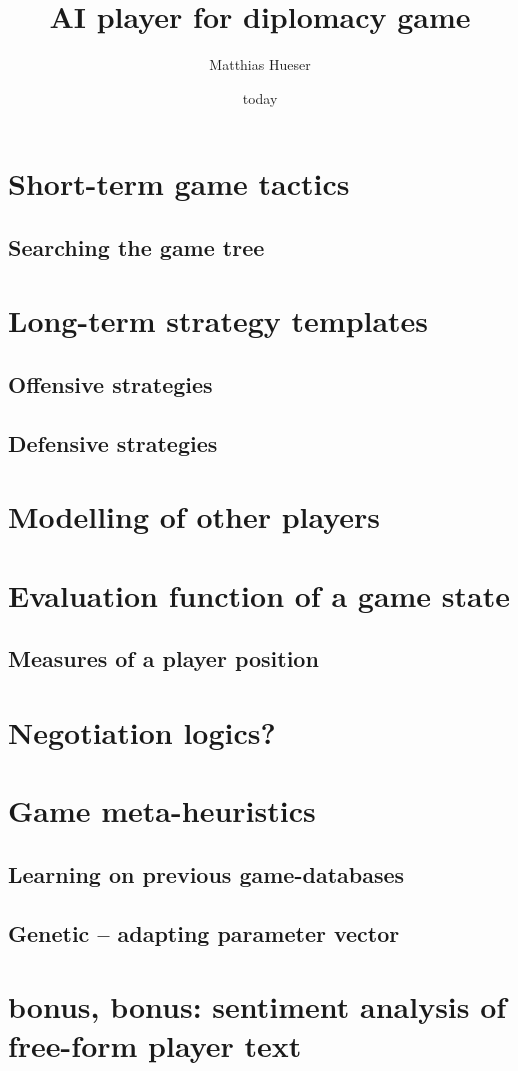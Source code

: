 \documentclass[12pt]{article}
\title{AI player for diplomacy game}
\author{Matthias Hueser}
\date{today}
\begin{document}
\maketitle

\section{Short-term game tactics}

\subsection{Searching the game tree}

\section{Long-term strategy templates}

\subsection{Offensive strategies}

\subsection{Defensive strategies}

\section{Modelling of other players}

\section{Evaluation function of a game state}

\subsection{Measures of a player position}


\section{Negotiation logics?}

\section{Game meta-heuristics}

\subsection{Learning on previous game-databases}

\subsection{Genetic -- adapting parameter vector}

\section{bonus, bonus: sentiment analysis of free-form player text}
\end{document}
